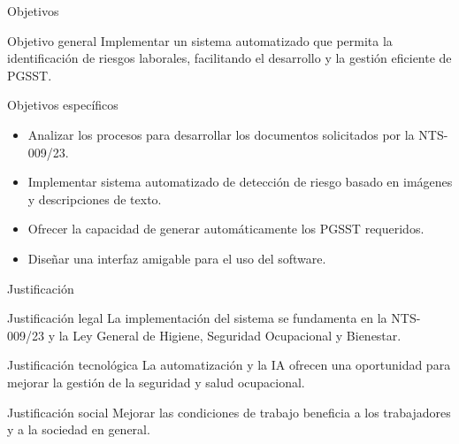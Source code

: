 \documentclass[spanish, aspectratio=169]{beamer}
\begin{document}
\begin{frame}{Objetivos}
  \begin{block}{Objetivo general}
  Implementar un sistema automatizado que permita la identificación de riesgos laborales, facilitando el desarrollo y la gestión eficiente de PGSST.
  \end{block}
  \begin{block}{Objetivos específicos}
  \begin{itemize}
  \item Analizar los procesos para desarrollar los documentos solicitados por la NTS-009/23.
  \item Implementar sistema automatizado de detección de riesgo basado en imágenes y descripciones de texto.
  \item Ofrecer la capacidad de generar automáticamente los PGSST requeridos.
  \item Diseñar una interfaz amigable para el uso del software.
  \end{itemize}
  \end{block}
\end{frame}

\begin{frame}{Justificación}
  \begin{block}{Justificación legal}
  La implementación del sistema se fundamenta en la NTS-009/23 y la Ley General de Higiene, Seguridad Ocupacional y Bienestar.
  \end{block}
  \begin{block}{Justificación tecnológica}
  La automatización y la IA ofrecen una oportunidad para mejorar la gestión de la seguridad y salud ocupacional.
  \end{block}
  \begin{block}{Justificación social}
  Mejorar las condiciones de trabajo beneficia a los trabajadores y a la sociedad en general.
  \end{block}
\end{frame}
\end{document}
